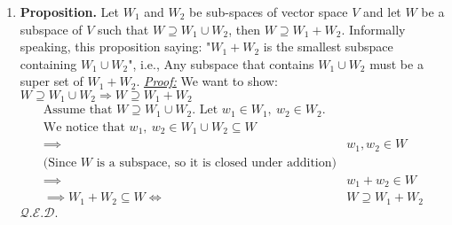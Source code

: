 \documentclass[oneside, 12pt]{book}
\newcommand{\settag}[1]{\renewcommand{\theenumi}{#1}}
\newcommand{\qed}{\hfill $\mathcal{Q}.\mathcal{E}.\mathcal{D}.$}
\newcommand{\tit}[1]{\textit{#1}}
\begin{document}
\begin{enumerate}
        \settag{1.3.11}
        \item \textbf{Proposition.} Let $W_1$ and $W_2$ be sub-spaces of vector space $V$ and let $W$ be a subspace of $V$ such that $W\supseteq W_1 \cup W_2$, then $W\supseteq W_1 + W_2$. Informally speaking, this proposition saying: "$W_1+W_2$ is the smallest subspace containing $W_1\cup W_2$", i.e., Any subspace that contains $W_1\cup W_2$ must be a super set of $W_1 + W_2$. \newline
        \tit{\underline{Proof:}}\newline
        We want to show: $W\supseteq W_1\cup W_2\Longrightarrow W\supseteq W_1 + W_2$\newline
            \begin{align*}
                \text{Assume that } \text{$W\supseteq W_1 \cup W_2$. Let $w_1\in W_1,~w_2\in W_2$.}\\
                \text{We notice that } w_1,~w_2\in W_1\cup W_2 \subseteq W \\
                \implies& w_1, w_2\in W \\
                \text{(Since $W$ is a subspace, so it is closed under addition)}\\
                \implies& w_1 + w_2 \in W\\
                \implies W_1 + W_2 \subseteq W \iff& W \supseteq W_1 + W_2 
            \end{align*}
            \qed
        
    \end{enumerate}
\end{document}
